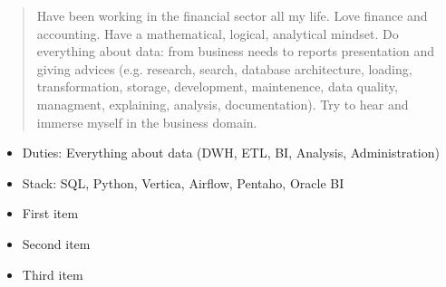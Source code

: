 \documentclass[10pt,a4paper,ragged2e,withhyper]{altacv}
\begin{document}
\begin{paracol}{2}


        \newpage

        \switchcolumn

            \begin{quote}
                Have been working in the financial sector all my life.
                Love finance and accounting. Have a mathematical, logical, analytical mindset.
                Do everything about data: from business needs to reports presentation and giving advices (e.g. research, search, database architecture, loading, transformation, storage, development, maintenence, data quality, managment, explaining, analysis, documentation).
                Try to hear and immerse myself in the business domain.
            \end{quote}

            \begin{itemize}
                \item Duties: Everything about data (DWH, ETL, BI, Analysis, Administration)
                \item Stack: SQL, Python, Vertica, Airflow, Pentaho, Oracle BI
            \end{itemize}
            \divider

            \begin{itemize}
                \item First item
                \item Second item
                \item Third item
            \end{itemize}


\end{paracol}
\end{document}
